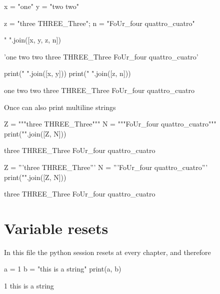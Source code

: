 \documentclass[oneside]{book}
\begin{document}
\begin{pycell}
x = "one"
y = "two two"
\end{pycell}

\begin{pycell}
z = "three THREE_Three"; n = "FoUr_four quattro_cuatro"
\end{pycell}

\begin{pycell}
" ".join([x, y, z, n])
\end{pycell}
\begin{pyexpectedoutput}
'one two two three THREE_Three FoUr_four quattro_cuatro'
\end{pyexpectedoutput}

\begin{pycell}
print(" ".join([x, y]))
print(" ".join([z, n]))
\end{pycell}
\begin{pyexpectedoutput}
one two two
three THREE_Three FoUr_four quattro_cuatro
\end{pyexpectedoutput}

Once can also print multiline strings
\begin{pycell}
Z = """three
THREE_Three"""
N = """FoUr_four
quattro_cuatro"""
print("\n".join([Z, N]))
\end{pycell}
\begin{pyexpectedoutput}
three
THREE_Three
FoUr_four
quattro_cuatro
\end{pyexpectedoutput}

\begin{pycell}
Z = '''three
THREE_Three'''
N = '''FoUr_four
quattro_cuatro'''
print("\n".join([Z, N]))
\end{pycell}
\begin{pyexpectedoutput}
three
THREE_Three
FoUr_four
quattro_cuatro
\end{pyexpectedoutput}

\chapter{Variable resets}

In this file the python session resets at every chapter, and therefore

\begin{pycell}
a = 1
b = "this is a string"
print(a, b)
\end{pycell}
\begin{pyexpectedoutput}
1 this is a string
\end{pyexpectedoutput}
\end{document}
